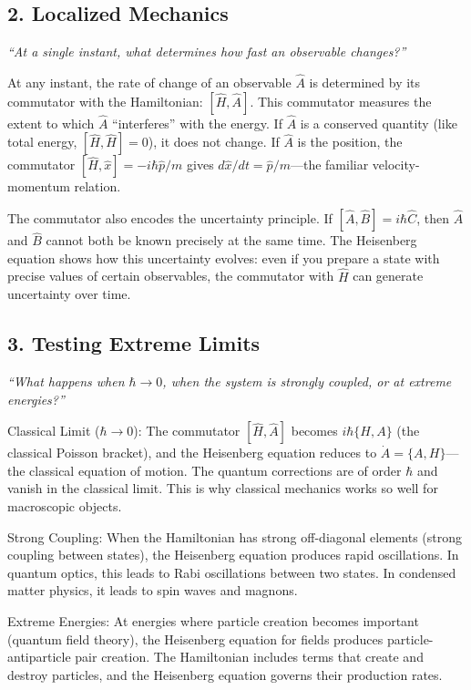 \subsection*{2. Localized Mechanics}
\textit{``At a single instant, what determines how fast an observable changes?''}

At any instant, the rate of change of an observable $\hat{A}$ is determined by its commutator with the Hamiltonian: $[\hat{H}, \hat{A}]$. This commutator measures the extent to which $\hat{A}$ ``interferes'' with the energy. If $\hat{A}$ is a conserved quantity (like total energy, $[\hat{H}, \hat{H}] = 0$), it does not change. If $\hat{A}$ is the position, the commutator $[\hat{H}, \hat{x}] = -i\hbar\hat{p}/m$ gives $d\hat{x}/dt = \hat{p}/m$---the familiar velocity-momentum relation.

The commutator also encodes the uncertainty principle. If $[\hat{A}, \hat{B}] = i\hbar\hat{C}$, then $\hat{A}$ and $\hat{B}$ cannot both be known precisely at the same time. The Heisenberg equation shows how this uncertainty evolves: even if you prepare a state with precise values of certain observables, the commutator with $\hat{H}$ can generate uncertainty over time.

\subsection*{3. Testing Extreme Limits}
\textit{``What happens when $\hbar \to 0$, when the system is strongly coupled, or at extreme energies?''}

Classical Limit ($\hbar \to 0$): The commutator $[\hat{H}, \hat{A}]$ becomes $i\hbar\{H, A\}$ (the classical Poisson bracket), and the Heisenberg equation reduces to $\dot{A} = \{A, H\}$---the classical equation of motion. The quantum corrections are of order $\hbar$ and vanish in the classical limit. This is why classical mechanics works so well for macroscopic objects.

Strong Coupling: When the Hamiltonian has strong off-diagonal elements (strong coupling between states), the Heisenberg equation produces rapid oscillations. In quantum optics, this leads to Rabi oscillations between two states. In condensed matter physics, it leads to spin waves and magnons.

Extreme Energies: At energies where particle creation becomes important (quantum field theory), the Heisenberg equation for fields produces particle-antiparticle pair creation. The Hamiltonian includes terms that create and destroy particles, and the Heisenberg equation governs their production rates.

